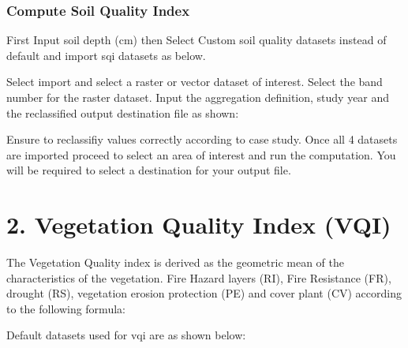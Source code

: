 \documentclass[letterpaper,10pt,english]{sphinxmanual}
\begin{document}
\subsubsection{Compute Soil Quality Index}
\label{\detokenize{Qgis_Plugin/Calculate_medalus:compute-soil-quality-index}}
\sphinxAtStartPar
First Input soil depth (cm) then Select Custom soil
quality datasets instead of default and import sqi datasets as below.


\sphinxAtStartPar
Select import and select a raster or vector dataset of interest. Select the band number for the
raster dataset. Input the aggregation definition, study year and the reclassified output destination file as shown:


\sphinxAtStartPar
Ensure to reclassifiy values correctly according to case study. Once all 4 datasets are imported proceed
to select an area of interest and run the computation. You will be required to select a destination for your
output file.



\section{2. Vegetation Quality Index (VQI)}
\label{\detokenize{Qgis_Plugin/Calculate_medalus:vegetation-quality-index-vqi}}
\sphinxAtStartPar
The Vegetation Quality index is derived as the geometric mean of the characteristics of the vegetation. Fire Hazard layers (RI),
Fire Resistance (FR), drought (RS), vegetation erosion protection (PE) and cover plant (CV) according to the
following formula:

\sphinxAtStartPar
{}

\sphinxAtStartPar
Default datasets used for vqi are as shown below:
\end{document}
